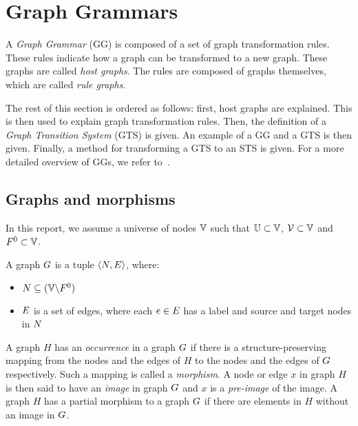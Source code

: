 \section{Graph Grammars}\label{sec:graph}
A \textit{Graph Grammar} (GG) is composed of a set of graph transformation rules. These rules indicate how a graph can be transformed to a new graph. These graphs are called \textit{host graphs}. The rules are composed of graphs themselves, which are called \textit{rule graphs}.

The rest of this section is ordered as follows: first, host graphs are explained. This is then used to explain graph transformation rules. Then, the definition of a \textit{Graph Transition System} (GTS) is given. An example of a GG and a GTS is then given. Finally, a method for transforming a GTS to an STS is given. For a more detailed overview of GGs, we refer to~\cite{Rensink:graph_grammars, Heckel2006187, Andries1999}.

\subsection{Graphs and morphisms}
In this report, we assume a universe of nodes $\mathbb{V}$ such that $\mathbb{U} \subset \mathbb{V}$, $\mathcal{V} \subset \mathbb{V}$ and $F^0 \subset \mathbb{V}$.

A graph $G$ is a tuple $\langle N, E\rangle$, where:
\begin{itemize}
  \item $N \subseteq (\mathbb{V} \backslash F^0)$
  \item $E$ is a set of edges, where each $e \in E$ has a label and source and target nodes in $N$
\end{itemize}

A graph $H$ has an \textit{occurrence} in a graph $G$ if there is a structure-preserving mapping from the nodes and the edges of $H$ to the nodes and the edges of $G$ respectively. Such a mapping is called a \textit{morphism}. A node or edge $x$ in graph $H$ is then said to have an \textit{image} in graph $G$ and $x$ is a \textit{pre-image} of the image. A graph $H$ has a partial morphism to a graph $G$ if there are elements in $H$ without an image in $G$.

